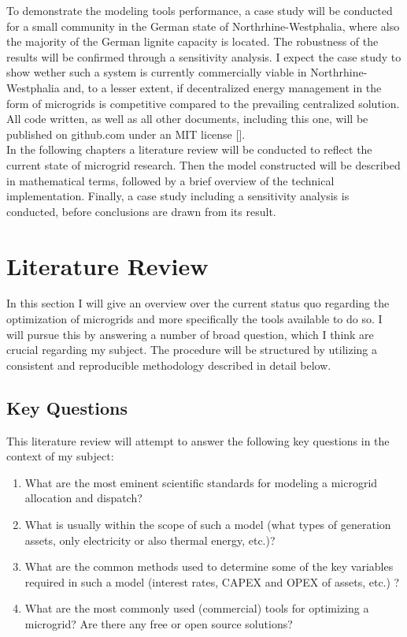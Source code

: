 \documentclass[
	11pt,								%
	DIV10,								%
	a4paper,         					%
	oneside,							%
	headheight=20pt,					%
	footheight=20pt,					%
    parskip=full,						%
    listof=totoc,						%
	bibliography=totoc,					%
	index=totoc,						%
]{scrartcl}
\begin{document}
To demonstrate the modeling tools performance, a case study will be conducted for a small community in the German state of Northrhine-Westphalia, where also the majority of the German lignite capacity is located. The robustness of the results will be confirmed through a sensitivity analysis.
I expect the case study to show wether such a system is currently commercially viable in Northrhine-Westphalia and, to a lesser extent, if decentralized energy management in the form of microgrids is competitive compared to the prevailing centralized solution.
All code written, as well as all other documents, including this one, will be published on github.com under an MIT license [\cite{MITLicense2018}].
\\
In the following chapters a literature review will be conducted to reflect the current state of microgrid research. Then the model constructed will be described in mathematical terms, followed by a brief overview of the technical implementation. Finally, a case study including a sensitivity analysis is conducted, before conclusions are drawn from its result.

\newpage
{}	

\section{Literature Review}
In this section I will give an overview over the current status quo regarding the optimization of microgrids and more specifically the tools available to do so. I will pursue  this by answering a number of broad question, which I think are crucial regarding my subject. The procedure will be structured by utilizing a consistent and reproducible methodology described in detail below. 

\subsection{Key Questions}
This literature review will attempt to answer the following key questions in the context of my subject:
\begin{enumerate}
	\item What are the most eminent scientific standards for modeling a microgrid allocation and dispatch?
	\item What is usually within the scope of such a model (what types of generation assets, only electricity or also thermal energy, etc.)? 
	\item What are the common methods used to determine some of the key variables required in such a model (interest rates, CAPEX and OPEX of assets, etc.) ?
	\item What are the most commonly used (commercial) tools for optimizing a microgrid? Are there any free or open source solutions? 
\end{enumerate} 
\end{document}

